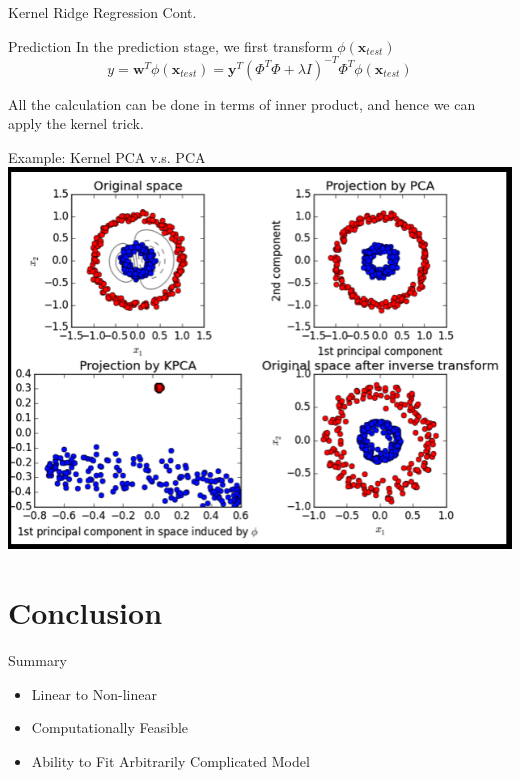 \documentclass[10pt, compress]{beamer}
\begin{document}
\begin{frame}[fragile]{Kernel Ridge Regression Cont.}
  \begin{block}{Prediction}
    In the prediction stage, we first transform \( \phi(\mathbf{x}_{test}) \)
    \[
      y = \mathbf{w}^T \phi(\mathbf{x}_{test}) = \mathbf{y}^T {(\Phi^T \Phi + \lambda I)}^{-T} {\Phi}^T \phi(\mathbf{x}_{test})
    \]

    All the calculation can be done in terms of inner product, and hence we can apply the kernel trick.
  \end{block}
\end{frame}

\begin{frame}[fragile]{Example: Kernel PCA v.s. PCA}
  \includegraphics[width=\textwidth, height=.7\textheight]{images/KPCA.png}
\end{frame}

\section{Conclusion}

\begin{frame}{Summary}

  \begin{itemize}
    \item Linear to Non-linear
    \item Computationally Feasible
    \item Ability to Fit Arbitrarily Complicated Model
  \end{itemize}

\end{frame}

\end{document}
